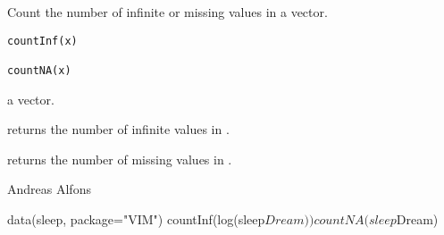 %
\begin{Description}\relax
Count the number of infinite or missing values in a vector.
\end{Description}
%
\begin{Usage}
\begin{verbatim}
countInf(x)

countNA(x)
\end{verbatim}
\end{Usage}
%
\begin{Arguments}
\begin{ldescription}
\item[\code{x}] a vector.
\end{ldescription}
\end{Arguments}
%
\begin{Value}
 returns the number of infinite values in .

 returns the number of missing values in .
\end{Value}
%
\begin{Author}\relax
Andreas Alfons
\end{Author}
%
\begin{Examples}
\begin{ExampleCode}
data(sleep, package="VIM")
countInf(log(sleep$Dream))
countNA(sleep$Dream)
\end{ExampleCode}
\end{Examples}
